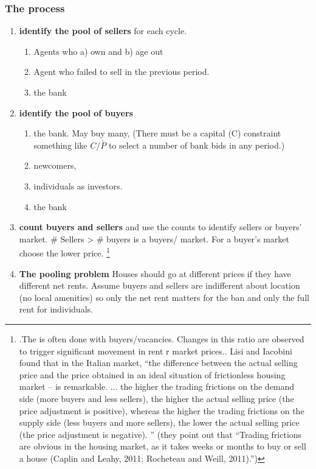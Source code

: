 \subsubsection{The process}
\begin{enumerate}
\item \textbf{identify the pool of sellers} for each cycle.
    \begin{enumerate}
        \item Agents who a) own and b) age out
        \item Agent  who failed to sell in the previous period.
        \item the bank
    \end{enumerate}
\item \textbf{identify the pool of buyers} 
    \begin{enumerate}
        \item the bank. May buy many, (There must be a capital (C) constraint something like $C/\bar P$ to select a number of bank bids in any period.)
     \item newcomers, 
     \item individuals as investors.
     \item the bank
    \end{enumerate}

\item \textbf{count buyers and sellers} and use the counts to identify sellers or buyers' market. \# Sellers > \# buyers is a buyers/ market. For a buyer's market  choose the lower price. \footnote{.The is often done with buyers/vacancies. Changes in this ratio are observed to trigger significant movement in rent r market prices.\cite{wheatonVacancySearchPrices1990}. Lisi and Iacobini \cite{lisiEstimatingHousingPrice2015} found  that in the Italian market, ``the difference between the actual selling price and the price obtained in an ideal situation of frictionless housing market – is remarkable. ... the higher the trading frictions on the demand side (more buyers and less sellers), the higher the actual selling price (the price adjustment is positive), whereas the higher the trading frictions on the supply side (less buyers and more sellers), the lower the actual selling price (the price adjustment is negative). '' (they point out that ``Trading frictions are obvious in the housing market, as it takes weeks or months to buy or sell a house (Caplin and Leahy, 2011; Rocheteau and Weill, 2011).'')}  

\item \textbf{The pooling problem}  Houses should go at different prices if they have different net rents.  Assume buyers and sellers are indifferent about location (no  local amenities) so only the net rent matters for the ban and only the full rent for individuals.


\end{enumerate}

